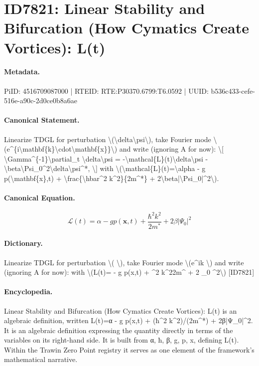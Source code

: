 \section*{ID7821: Linear Stability and Bifurcation (How Cymatics Create Vortices): L(t)}
\paragraph{Metadata.}
PiID: 4516709087000 | RTEID: RTE:P30370.6799:T6.0592 | UUID: b536c433-cefe-516e-a90c-2d0ce0b8a6ae

\paragraph{Canonical Statement.}
Linearize TDGL for perturbation \textbackslash{}(\textbackslash{}delta\textbackslash{}psi\textbackslash{}), take Fourier mode \textbackslash{}(e\textasciicircum{}\{i\textbackslash{}mathbf\{k\}\textbackslash{}cdot\textbackslash{}mathbf\{x\}\}\textbackslash{}) and write (ignoring A for now): \textbackslash{}[ \textbackslash{}Gamma\textasciicircum{}\{-1\}\textbackslash{}partial\_t \textbackslash{}delta\textbackslash{}psi = -\textbackslash{}mathcal\{L\}(t)\textbackslash{}delta\textbackslash{}psi - \textbackslash{}beta\textbackslash{}Psi\_0\textasciicircum{}2\textbackslash{}delta\textbackslash{}psi\textasciicircum{}*, \textbackslash{}] with \textbackslash{}(\textbackslash{}mathcal\{L\}(t)=\textbackslash{}alpha - g p(\textbackslash{}mathbf\{x\},t) + \textbackslash{}frac\{\textbackslash{}hbar\textasciicircum{}2 k\textasciicircum{}2\}\{2m\textasciicircum{}*\} + 2\textbackslash{}beta|\textbackslash{}Psi\_0|\textasciicircum{}2\textbackslash{}).

\paragraph{Canonical Equation.}
\[
\mathcal{L}(t)=\alpha - g p(\mathbf{x},t) + \frac{\hbar^2 k^2}{2m^*} + 2\beta|\Psi_0|^2
\]

\paragraph{Dictionary.}
Linearize TDGL for perturbation \textbackslash{}( \textbackslash{}), take Fourier mode \textbackslash{}(e\textasciicircum{}ik \textbackslash{}) and write (ignoring A for now): with \textbackslash{}(L(t)= - g p(x,t) + \textasciicircum{}2 k\textasciicircum{}22m\textasciicircum{} + 2 \_0 \textasciicircum{}2\textbackslash{}) [ID7821]

\paragraph{Encyclopedia.}
Linear Stability and Bifurcation (How Cymatics Create Vortices): L(t) is an algebraic definition, written L(t)=α - g p(x,t) + (ħ\textasciicircum{}2 k\textasciicircum{}2)/(2m\textasciicircum{}*) + 2β|Ψ\_0|\textasciicircum{}2. It is an algebraic definition expressing the quantity directly in terms of the variables on its right-hand side. It is built from α, ħ, β, g, p, x, defining L(t). Within the Trawin Zero Point registry it serves as one element of the framework's mathematical narrative.
